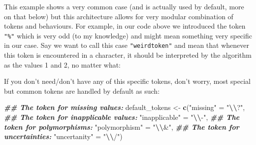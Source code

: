 \documentclass[
]{book}
\newenvironment{Shaded}{\begin{snugshade}}{\end{snugshade}}
\newcommand{\ControlFlowTok}[1]{\textcolor[rgb]{0.13,0.29,0.53}{\textbf{#1}}}
\newcommand{\DecValTok}[1]{\textcolor[rgb]{0.00,0.00,0.81}{#1}}
\newcommand{\DocumentationTok}[1]{\textcolor[rgb]{0.56,0.35,0.01}{\textbf{\textit{#1}}}}
\newcommand{\FunctionTok}[1]{\textcolor[rgb]{0.13,0.29,0.53}{\textbf{#1}}}
\newcommand{\NormalTok}[1]{#1}
\newcommand{\OtherTok}[1]{\textcolor[rgb]{0.56,0.35,0.01}{#1}}
\newcommand{\SpecialCharTok}[1]{\textcolor[rgb]{0.81,0.36,0.00}{\textbf{#1}}}
\newcommand{\StringTok}[1]{\textcolor[rgb]{0.31,0.60,0.02}{#1}}
\begin{document}
This example shows a very common case (and is actually used by default, more on that below) but this architecture allows for very modular combination of tokens and behaviours.
For example, in our code above we introduced the token \texttt{"\%"} which is very odd (to my knowledge) and might mean something very specific in our case.
Say we want to call this case \texttt{"weirdtoken"} and mean that whenever this token is encountered in a character, it should be interpreted by the algorithm as the values 1 and 2, no matter what:

\begin{Shaded}
\end{Shaded}

If you don't need/don't have any of this specific tokens, don't worry, most special but common tokens are handled by default as such:

\begin{Shaded}
\begin{Highlighting}[]
\DocumentationTok{\#\# The token for missing values:}
\NormalTok{default\_tokens }\OtherTok{\textless{}{-}} \FunctionTok{c}\NormalTok{(}\StringTok{"missing"}      \OtherTok{=} \StringTok{"}\SpecialCharTok{\textbackslash{}\textbackslash{}}\StringTok{?"}\NormalTok{,}
\DocumentationTok{\#\# The token for inapplicable values:                    }
                    \StringTok{"inapplicable"} \OtherTok{=} \StringTok{"}\SpecialCharTok{\textbackslash{}\textbackslash{}}\StringTok{{-}"}\NormalTok{,}
\DocumentationTok{\#\# The token for polymorphisms:}
                    \StringTok{"polymorphism"} \OtherTok{=} \StringTok{"}\SpecialCharTok{\textbackslash{}\textbackslash{}}\StringTok{\&"}\NormalTok{,}
\DocumentationTok{\#\# The token for uncertainties:}
                    \StringTok{"uncertanity"}  \OtherTok{=} \StringTok{"}\SpecialCharTok{\textbackslash{}\textbackslash{}}\StringTok{/"}\NormalTok{)}
\end{Highlighting}
\end{Shaded}
\end{document}
